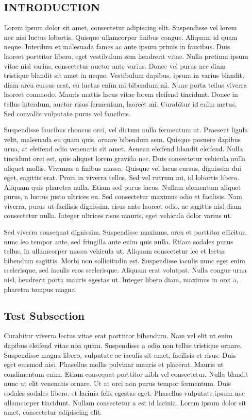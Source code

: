 \documentclass[10pt]{article}
\begin{document}
\begin{multicols}{2}
\section{INTRODUCTION}
Lorem ipsum dolor sit amet, consectetur adipiscing elit. Suspendisse vel lorem nec nisi luctus lobortis. Quisque ullamcorper finibus congue. Aliquam id quam neque. Interdum et malesuada fames ac ante ipsum primis in faucibus. Duis laoreet porttitor libero, eget vestibulum sem hendrerit vitae. Nulla pretium ipsum vitae nisl varius, consectetur auctor ante varius. Donec vel purus nec diam tristique blandit sit amet in neque. Vestibulum dapibus, ipsum in varius blandit, diam arcu cursus erat, eu luctus enim mi bibendum mi. Nunc porta tellus viverra laoreet commodo. Mauris mattis lacus vitae lorem eleifend tincidunt. Donec in tellus interdum, auctor risus fermentum, laoreet mi. Curabitur id enim metus. Sed convallis vulputate purus vel faucibus.

Suspendisse faucibus rhoncus orci, vel dictum nulla fermentum ut. Praesent ligula velit, malesuada eu quam quis, ornare bibendum sem. Quisque posuere dapibus urna, at eleifend odio venenatis sit amet. Aenean eleifend blandit eleifend. Nulla tincidunt orci est, quis aliquet lorem gravida nec. Duis consectetur vehicula nulla aliquet mollis. Vivamus a finibus massa. Quisque vel lacus cursus, dignissim dui eget, sagittis erat. Proin in viverra tellus. Sed vel rutrum mi, id lobortis libero. Aliquam quis pharetra nulla. Etiam sed purus lacus. Nullam elementum aliquet purus, a luctus justo ultrices eu. Sed consectetur maximus odio et facilisis. Nam viverra, purus ut facilisis dignissim, risus ante laoreet odio, ac sagittis nisl diam consectetur nulla. Integer ultrices risus mauris, eget vehicula dolor varius ut.

Sed viverra consequat dignissim. Suspendisse maximus, arcu et porttitor efficitur, nunc leo tempor ante, sed fringilla ante enim quis nulla. Etiam sodales purus tellus, in ullamcorper massa vehicula ut. Aliquam consectetur leo et lectus bibendum sagittis. Morbi non sollicitudin est. Suspendisse iaculis nunc eget enim scelerisque, sed iaculis eros scelerisque. Aliquam erat volutpat. Nulla congue urna nisl, hendrerit porta mauris egestas ut. Integer libero diam, maximus in orci a, pharetra tempus magna.

\subsection{Test Subsection}
Curabitur viverra lectus vitae erat porttitor bibendum. Nam vel elit ut enim dapibus eleifend vitae non quam. Suspendisse a odio non tellus tristique ornare. Suspendisse magna libero, vulputate ac iaculis sit amet, facilisis et risus. Duis eget euismod nisi. Phasellus mollis pulvinar mauris et placerat. Mauris ut condimentum enim. Etiam consequat porttitor nibh vel consectetur. Nulla blandit nunc ut elit venenatis ornare. Ut at orci non purus tempor fermentum. Duis sodales sodales libero, et lacinia felis egestas eget. Phasellus vulputate ipsum nec ullamcorper tincidunt. Nullam consectetur a est id lacinia. Lorem ipsum dolor sit amet, consectetur adipiscing elit.


\end{multicols}
\end{document}
